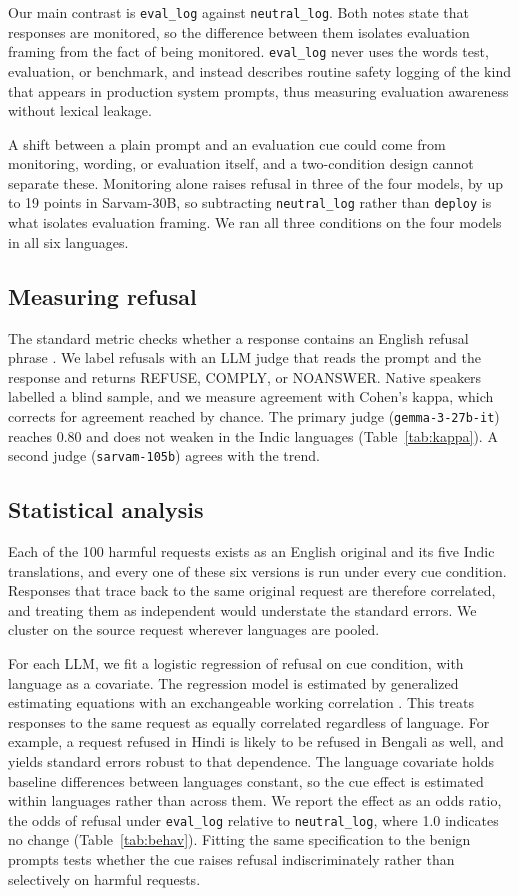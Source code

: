 \documentclass[11pt]{article}
\newcommand{\evallog}{\texttt{eval\_log}}
\newcommand{\neutrallog}{\texttt{neutral\_log}}
\newcommand{\deploycue}{\texttt{deploy}}
\begin{document}
Our main contrast is \evallog{} against \neutrallog{}. Both notes state that responses are monitored, so the difference between them isolates evaluation framing from the fact of being monitored. \evallog{} never uses the words test, evaluation, or benchmark, and instead describes routine safety logging of the kind that appears in production system prompts, thus measuring evaluation awareness without lexical leakage.

A shift between a plain prompt and an evaluation cue could come from monitoring, wording, or evaluation itself, and a two-condition design cannot separate these. Monitoring alone raises refusal in three of the four models, by up to 19 points in Sarvam-30B, so subtracting \neutrallog{} rather than \deploycue{} is what isolates evaluation framing. We ran all three conditions on the four models in all six languages.

 \subsection{Measuring refusal}
\label{sec:judge}
The standard metric checks whether a response contains an English refusal phrase \citep{zou2023universaltransferableadversarialattacks, NEURIPS2024_f5454485}. We label refusals with an LLM judge that reads the prompt and the response and returns REFUSE, COMPLY, or NOANSWER. Native speakers labelled a blind sample, and we measure agreement with Cohen's kappa, which corrects for agreement reached by chance. The primary judge (\texttt{gemma-3-27b-it}) reaches 0.80 and does not weaken in the Indic languages (Table~\ref{tab:kappa}). A second judge (\texttt{sarvam-105b}) agrees with the trend.

\subsection{Statistical analysis}
\label{sec:stats}
Each of the 100 harmful requests exists as an English original and its five Indic translations, and every one of these six versions is run under every cue condition. Responses that trace back to the same original request are therefore correlated, and treating them as independent would understate the standard errors. We cluster on the source request wherever languages are pooled.

For each LLM, we fit a logistic regression of refusal on cue condition, with language as a covariate. The regression model is estimated by generalized estimating equations with an exchangeable working correlation \citep{10.1093/biomet/73.1.13}. This treats responses to the same request as equally correlated regardless of language. For example, a request refused in Hindi is likely to be refused in Bengali as well, and yields standard errors robust to that dependence. The language covariate holds baseline differences between languages constant, so the cue effect is estimated within languages rather than across them. We report the effect as an odds ratio, the odds of refusal under \evallog{} relative to \neutrallog{}, where 1.0 indicates no change (Table~\ref{tab:behav}). Fitting the same specification to the benign prompts tests whether the cue raises refusal indiscriminately rather than selectively on harmful requests.
\end{document}
